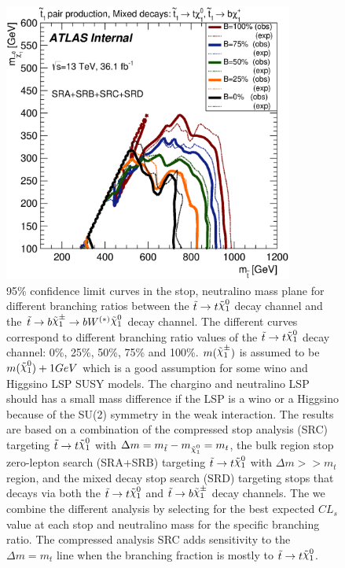 \begin{figure}[h!]
	\begin{center}
		\includegraphics[width=0.85\textwidth]{figures/fit//SRABCD_mixed_dm1.eps}
		\caption[Observed 95\% confidence limits in the stop, neutralino mass plane for different branching ratios between the $\stop\ra t\ninoone$ decay channel
                  and the $\stop\ra b\chinoonepm$ channel]{
		95\% confidence limit curves in the stop, neutralino mass plane for different branching ratios between the $\stop\ra t\ninoone$ decay channel
                  and the $\stop\ra b\chinoonepm\ra b W^{(*)}\ninoone$ decay channel. 
                  The different curves correspond to different branching ratio values of the
                  $\stop\ra t\ninoone$ decay channel: 0\%, 25\%, 50\%, 75\% and 100\%.  
                   $m(\chinoonepm)$ is assumed to be $m(\ninoone)+1 GeV$ which is a good assumption for some
                   wino and Higgsino LSP SUSY models.  The chargino and neutralino LSP should has a small mass
                   difference if the LSP is a wino or a Higgsino because of the SU(2) symmetry in the weak interaction.
                  The results are based on a combination of the compressed stop analysis (SRC) targeting $\stop\ra t\ninoone$ with $\Delta m = m_{\stop} - m_{\ninoone} = m_{t}$, the bulk region stop zero-lepton search (SRA+SRB) targeting $\stop\ra t\ninoone$ with $\Delta m >> m_{t}$ region, and the mixed decay stop search (SRD) targeting stops that decays via both the $\stop\ra t\ninoone$ and $\stop\ra b\chinoonepm$ decay channels.  The we combine the different analysis by selecting for the best
                  expected $CL_s$ value at each stop and neutralino mass for the specific branching ratio. 
                   The compressed analysis SRC adds sensitivity to the $\Delta m = m_t$ line when the branching fraction is mostly to $\stop\ra t\ninoone$.}
		\label{figure.exclusion.SRABCD_dm1}
	\end{center}
\end{figure}
